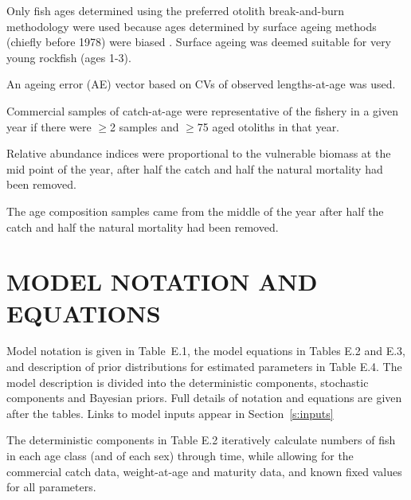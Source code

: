 \documentclass[11pt]{book}
\def\AppLet{E}%
\begin{document}
\begin{enumerate_csas}{}{}
\item Only fish ages determined using the preferred otolith break-and-burn methodology \citep{MacLellan:1997} were used because ages determined by surface ageing methods (chiefly before 1978) were biased \citep{Beamish:1979}. Surface ageing was deemed suitable for very young rockfish (ages 1-3).
\item An ageing error (AE) vector based on CVs of observed lengths-at-age was used.
\item Commercial samples of catch-at-age were representative of the fishery in a given year if there were $\geq$2 samples and $\geq$75 aged otoliths in that year.
\item Relative abundance indices were proportional to the vulnerable biomass at the mid point of the year, after half the catch and half the natural mortality had been removed.
\item The age composition samples came from the middle of the year after half the catch and half the natural mortality had been removed.
\end{enumerate_csas}

\clearpage

\section{MODEL NOTATION AND EQUATIONS}

Model notation is given in Table~\AppLet.1, the model equations in Tables \AppLet.2 and \AppLet.3, and description of prior distributions for estimated parameters in Table \AppLet.4. 
The model description is divided into the deterministic components, stochastic components and Bayesian priors. 
Full details of notation and equations are given after the tables. %
Links to model inputs appear in Section~\ref{s:inputs}%

The deterministic components in Table \AppLet.2 iteratively calculate numbers of fish in each age class (and of each sex) through time, while allowing for the commercial catch data, weight-at-age and maturity data, and known fixed values for all parameters.
\end{document}
